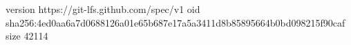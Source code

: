 version https://git-lfs.github.com/spec/v1
oid sha256:4ed0aa6a7d0688126a01e65b687e17a5a3411d8b85895664b0bd098215f90caf
size 42114
